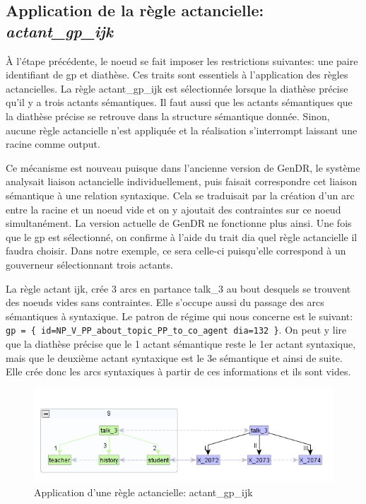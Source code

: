\subsection{Application de la règle actancielle: \emph{actant\_gp\_ijk}}
À l'étape précédente, le noeud  se fait imposer les restrictions suivantes: une paire identifiant de gp et diathèse. Ces traits sont essentiels à l'application des règles actancielles. La règle actant\_gp\_ijk est sélectionnée lorsque la diathèse précise qu'il y a trois actants sémantiques. Il faut aussi que les actants sémantiques que la diathèse précise se retrouve dans la structure sémantique donnée. Sinon, aucune règle actancielle n'est appliquée et la réalisation s'interrompt laissant une racine comme output. 

Ce mécanisme est nouveau puisque dans l'ancienne version de GenDR, le système analysait liaison actancielle individuellement, puis faisait correspondre cet liaison sémantique à une relation syntaxique. Cela se traduisait par la création d'un arc entre la racine et un noeud vide et on y ajoutait des contraintes sur ce noeud simultanément. La version actuelle de GenDR ne fonctionne plus ainsi. Une fois que le gp est sélectionné, on confirme à l'aide du trait dia quel règle actancielle il faudra choisir. Dans notre exemple, ce sera celle-ci puisqu'elle correspond à un gouverneur sélectionnant trois actants.

La règle actant ijk, crée 3 arcs en partance talk\_3 au bout desquels se trouvent des noeuds vides sans contraintes. Elle s'occupe aussi du passage des arcs sémantiques à syntaxique. Le patron de régime qui nous concerne est le suivant: \lstinline!gp = { id=NP_V_PP_about_topic_PP_to_co_agent dia=132 }!. On peut y lire que la diathèse précise que le 1 actant sémantique reste le 1er actant syntaxique, mais que le deuxième actant syntaxique est le 3e sémantique et ainsi de suite. Elle crée donc les arcs syntaxiques à partir de ces informations et ils sont vides.

\begin{figure}[htb]
	\centering
	\includegraphics[width=1\textwidth, trim = {0cm 0cm 0cm 0cm},clip]{ch6/figs/actant_gp_ijk.png}
	\caption{Application d'une règle actancielle: actant\_gp\_ijk}
	\label{deroulement2}
\end{figure}

